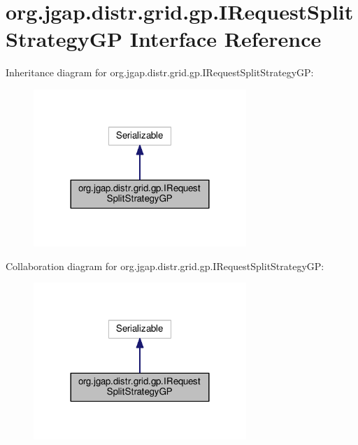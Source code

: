 \hypertarget{interfaceorg_1_1jgap_1_1distr_1_1grid_1_1gp_1_1_i_request_split_strategy_g_p}{\section{org.\-jgap.\-distr.\-grid.\-gp.\-I\-Request\-Split\-Strategy\-G\-P Interface Reference}
\label{interfaceorg_1_1jgap_1_1distr_1_1grid_1_1gp_1_1_i_request_split_strategy_g_p}
}


Inheritance diagram for org.\-jgap.\-distr.\-grid.\-gp.\-I\-Request\-Split\-Strategy\-G\-P\-:
\nopagebreak
\begin{figure}[H]
\begin{center}
\leavevmode
\includegraphics[width=228pt]{interfaceorg_1_1jgap_1_1distr_1_1grid_1_1gp_1_1_i_request_split_strategy_g_p__inherit__graph}
\end{center}
\end{figure}


Collaboration diagram for org.\-jgap.\-distr.\-grid.\-gp.\-I\-Request\-Split\-Strategy\-G\-P\-:
\nopagebreak
\begin{figure}[H]
\begin{center}
\leavevmode
\includegraphics[width=228pt]{interfaceorg_1_1jgap_1_1distr_1_1grid_1_1gp_1_1_i_request_split_strategy_g_p__coll__graph}
\end{center}
\end{figure}
